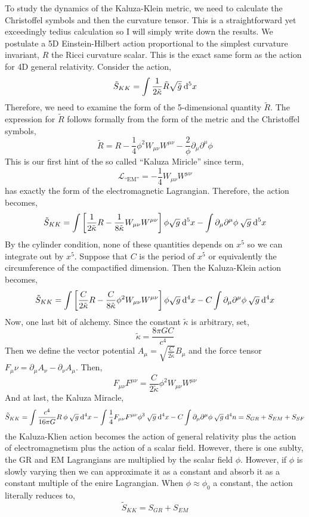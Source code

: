 \documentclass[11pt, a4paper]{article}
\begin{document}
To study the dynamics of the Kaluza-Klein metric, we need to calculate the Christoffel symbols and then the curvature tensor. This is a straightforward yet exceedingly tedius calculation so I will simply write down the results. We postulate a 5D Einstein-Hilbert action proportional to the simplest curvature invariant, $R$ the Ricci curvature scalar. This is the exact same form as the action for 4D general relativity. Consider the action,
\[ \tilde{S}_{KK} = \int \frac{1}{2 \tilde{\kappa}} \tilde{R} \sqrt{\tilde{g}} \: \mathrm{d}^{5} x\]
Therefore, we need to examine the form of the 5-dimensional quantity $\tilde{R}$. The expression for $\tilde{R}$ follows formally from the form of the metric and the Christoffel symbols,
\[ \tilde{R} = R  - \frac{1}{4} \phi^2 W_{\mu \nu} W^{\mu \nu} - \frac{2}{\phi} \partial_\mu \partial^\mu \phi \]
This is our first hint of the so called ``Kaluza Miricle'' since term,
\[ \mathcal{L}_{\text{``EM''}} = - \frac{1}{4} W_{\mu \nu} W^{\mu \nu} \] 
has exactly the form of the electromagnetic Lagrangian. Therefore, the action becomes,
\[ \tilde{S}_{KK} = \int \left[ \frac{1}{2 \tilde{\kappa}} R - \frac{1}{8 \tilde{\kappa}} W_{\mu \nu} W^{\mu \nu} \right] \phi \sqrt{g} \: \mathrm{d}^{5} x - \int \partial_\mu \partial^\mu \phi \: \sqrt{g} \: \mathrm{d}^{5} x \]
By the cylinder condition, none of these quantities depends on $x^5$ so we can integrate out by $x^5$. Suppose that $C$ is the period of $x^5$ or equivalently the circumference of the compactified dimension. Then the Kaluza-Klein action becomes,
\[ \tilde{S}_{KK} = \int \left[ \frac{C}{2 \tilde{\kappa}} R - \frac{C}{8 \tilde{\kappa}} \phi^2 W_{\mu \nu} W^{\mu \nu} \right] \phi \sqrt{g} \: \mathrm{d}^{4} x - C \int \partial_\mu \partial^\mu \phi \: \sqrt{g} \: \mathrm{d}^{4} x \]
Now, one last bit of alchemy. Since the constant $\tilde{\kappa}$ is arbitrary, set,
\[ \tilde{\kappa} = \frac{8 \pi G C}{c^4} \] 
Then we define the vector potential $A_\mu = \sqrt{\frac{C}{2 \tilde{\kappa}}} B_\mu$ and the force tensor $F_\mu \nu = \partial_\mu A_\nu - \partial_\nu A_\mu$. Then, 
\[ F_{\mu \nu} F^{\mu \nu} = \frac{C}{2 \tilde{\kappa}} \phi^2 W_{\mu \nu} W^{\mu \nu} \]
And at last, the Kaluza Miracle,
\[ \tilde{S}_{KK} = \int \frac{c^4}{16 \pi G} R \: \phi \: \sqrt{g} \: \mathrm{d}^{4} x - \int \frac{1}{4} F_{\mu \nu} F^{\mu \nu} \phi^3 \: \sqrt{g} \: \mathrm{d}^{4} x - C \int \partial_\mu \partial^\mu \phi \: \sqrt{g} \: \mathrm{d}^{4} n = S_{GR} + S_{EM} + S_{SF} \]
the Kaluza-Klien action becomes the action of general relativity plus the action of electromagnetism plus the action of a scalar field. However, there is one sublty, the GR and EM Lagrangians are multiplied by the scalar field $\phi$. However, if $\phi$ is slowly varying then we can approximate it as a constant and absorb it as a constant multiple of the enire Lagrangian. When $\phi \approx \phi_0$ a constant, the action literally reduces to,
\[ \tilde{S}_{KK} = S_{GR} + S_{EM} \]
\end{document}
